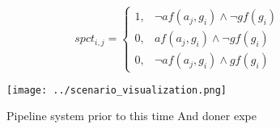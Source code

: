 \documentclass[a4paper]{article}
\begin{document}
\begin{equation}
spct_{i,j} =
\begin{cases}
1, & \text{$\neg af(a_j,g_i) \wedge \neg gf(g_i)$}\\
0, & \text{$af(a_j,g_i) \wedge \neg gf(g_i)$}\\
0, & \text{$\neg af(a_j,g_i) \wedge gf(g_i)$}
\end{cases}
\end{equation}

\begin{figure}
\centering
\texttt{[image: ../scenario\_visualization.png]}
\caption{Pipeline system prior to this time And doner expe
}
\end{figure}
 
\end{document}
